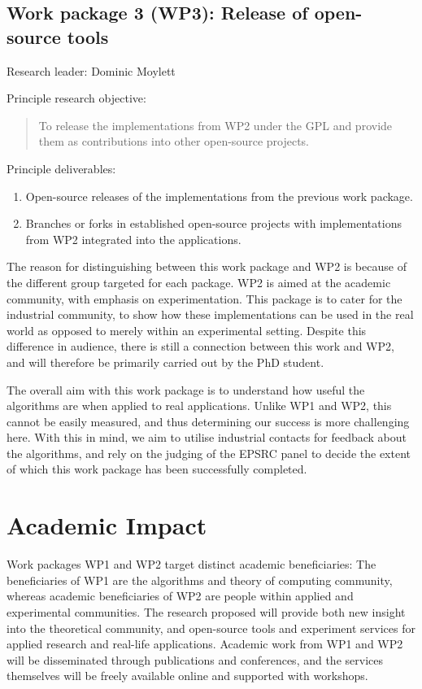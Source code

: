 \documentclass[a4paper,11pt]{article}
\begin{document}
    \subsection*{Work package 3 (WP3): Release of open-source tools}

    Research leader: Dominic Moylett

    Principle research objective:
    \begin{quote}
        To release the implementations from WP2 under the GPL and provide them as contributions into other open-source projects.
    \end{quote}

    Principle deliverables:
    \begin{enumerate}
        \item Open-source releases of the implementations from the previous work package.
        \item Branches or forks in established open-source projects with implementations from WP2 integrated into the applications.
    \end{enumerate}

    The reason for distinguishing between this work package and WP2 is because of the different group targeted for each package. WP2 is aimed at the academic community, with emphasis on experimentation. This package is to cater for the industrial community, to show how these implementations can be used in the real world as opposed to merely within an experimental setting. Despite this difference in audience, there is still a connection between this work and WP2, and will therefore be primarily carried out by the PhD student.

    The overall aim with this work package is to understand how useful the algorithms are when applied to real applications. Unlike WP1 and WP2, this cannot be easily measured, and thus determining our success is more challenging here. With this in mind, we aim to utilise industrial contacts for feedback about the algorithms, and rely on the judging of the EPSRC panel to decide the extent of which this work package has been successfully completed.

    \section{Academic Impact}

    Work packages WP1 and WP2 target distinct academic beneficiaries: The beneficiaries of WP1 are the algorithms and theory of computing community, whereas academic beneficiaries of WP2 are people within applied and experimental communities. The research proposed will provide both new insight into the theoretical community, and open-source tools and experiment services for applied research and real-life applications. Academic work from WP1 and WP2 will be disseminated through publications and conferences, and the services themselves will be freely available online and supported with workshops.
    
\end{document}
